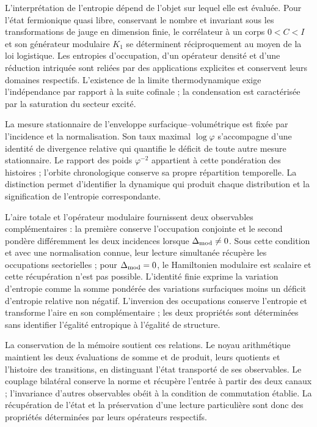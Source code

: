 L’interprétation de l’entropie dépend de l’objet sur lequel elle est
évaluée. Pour l’état fermionique quasi libre, conservant le nombre
et invariant sous les transformations de jauge en dimension finie,
le corrélateur à un corps \(0<C<I\) et son générateur modulaire \(K_1\)
se déterminent réciproquement au moyen de la loi logistique.
Les entropies d’occupation, d’un opérateur densité et d’une
réduction intriquée sont reliées par des applications explicites et
conservent leurs domaines respectifs. L’existence de la limite
thermodynamique exige l’indépendance par rapport à la suite cofinale ;
la condensation est caractérisée par la saturation du secteur excité.

La mesure stationnaire de l’enveloppe surfacique--volumétrique est fixée
par l’incidence et la normalisation. Son taux maximal \(\log\varphi\)
s’accompagne d’une identité de divergence relative qui quantifie le
déficit de toute autre mesure stationnaire. Le rapport des poids
\(\varphi^{-2}\) appartient à cette pondération des histoires ; l’orbite
chronologique conserve sa propre répartition temporelle. La distinction permet
d’identifier la dynamique qui produit chaque distribution et la signification
de l’entropie correspondante.

L’aire totale et l’opérateur modulaire fournissent deux observables
complémentaires : la première conserve l’occupation conjointe et le second
pondère différemment les deux incidences lorsque \(\Delta_{\rm mod}\ne0\).
Sous cette condition et avec une normalisation connue, leur lecture simultanée
récupère les occupations sectorielles ; pour \(\Delta_{\rm mod}=0\),
le Hamiltonien modulaire est scalaire et cette récupération n’est pas possible.
L’identité finie exprime la variation d’entropie comme la somme
pondérée des variations surfaciques moins un déficit d’entropie relative
non négatif. L’inversion des occupations
conserve l’entropie et transforme l’aire en son complémentaire ; les deux
propriétés sont déterminées sans identifier l’égalité entropique
à l’égalité de structure.

La conservation de la mémoire soutient ces relations. Le noyau
arithmétique maintient les deux évaluations de somme et de produit, leurs
quotients et l’histoire des transitions, en distinguant l’état
transporté de ses observables. Le couplage bilatéral conserve
la norme et récupère l’entrée à partir des deux canaux ; l’invariance
d’autres observables obéit à la condition de commutation établie.
La récupération de l’état et la préservation d’une lecture particulière
sont donc des propriétés déterminées par leurs opérateurs respectifs.

